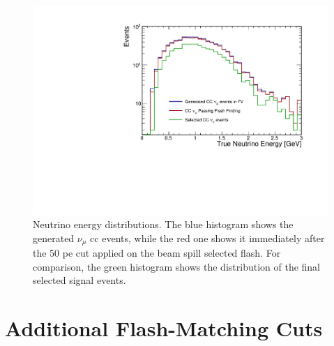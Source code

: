 \begin{figure}[]
\centering
\includegraphics[width=.70\textwidth]{images/nu_e_true_flash_sel}
\caption[True Neutrino Energy Distribution After Flash \acrshort{pe} Cut]{Neutrino energy distributions. The blue histogram shows the generated $\nu_\mu$ \acrshort{cc} events, while the red one shows it immediately after the 50 \acrshort{pe} cut applied on the beam spill selected flash. For comparison, the green histogram shows the distribution of the final selected signal events.}
\label{fig:nu_e_true_flash_sel}
\end{figure}



\section{Additional Flash-Matching Cuts}
\label{sec:selection_fm}

